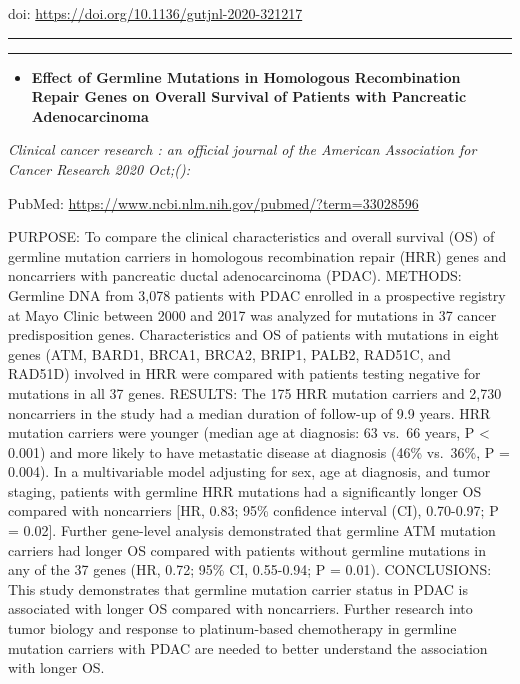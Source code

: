\documentclass[
]{article}
\providecommand{\tightlist}{%
  \setlength{\itemsep}{0pt}\setlength{\parskip}{0pt}}
\begin{document}
doi: \url{https://doi.org/10.1136/gutjnl-2020-321217}

\begin{center}\rule{0.5\linewidth}{0.5pt}\end{center}

\begin{center}\rule{0.5\linewidth}{0.5pt}\end{center}

\begin{itemize}
\tightlist
\item
  \textbf{Effect of Germline Mutations in Homologous Recombination
  Repair Genes on Overall Survival of Patients with Pancreatic
  Adenocarcinoma}
\end{itemize}

\emph{Clinical cancer research : an official journal of the American
Association for Cancer Research 2020 Oct;():}

PubMed: \url{https://www.ncbi.nlm.nih.gov/pubmed/?term=33028596}

PURPOSE: To compare the clinical characteristics and overall survival
(OS) of germline mutation carriers in homologous recombination repair
(HRR) genes and noncarriers with pancreatic ductal adenocarcinoma
(PDAC). METHODS: Germline DNA from 3,078 patients with PDAC enrolled in
a prospective registry at Mayo Clinic between 2000 and 2017 was analyzed
for mutations in 37 cancer predisposition genes. Characteristics and OS
of patients with mutations in eight genes (ATM, BARD1, BRCA1, BRCA2,
BRIP1, PALB2, RAD51C, and RAD51D) involved in HRR were compared with
patients testing negative for mutations in all 37 genes. RESULTS: The
175 HRR mutation carriers and 2,730 noncarriers in the study had a
median duration of follow-up of 9.9 years. HRR mutation carriers were
younger (median age at diagnosis: 63 vs.~66 years, P \textless{} 0.001)
and more likely to have metastatic disease at diagnosis (46\% vs.~36\%,
P = 0.004). In a multivariable model adjusting for sex, age at
diagnosis, and tumor staging, patients with germline HRR mutations had a
significantly longer OS compared with noncarriers {[}HR, 0.83; 95\%
confidence interval (CI), 0.70-0.97; P = 0.02{]}. Further gene-level
analysis demonstrated that germline ATM mutation carriers had longer OS
compared with patients without germline mutations in any of the 37 genes
(HR, 0.72; 95\% CI, 0.55-0.94; P = 0.01). CONCLUSIONS: This study
demonstrates that germline mutation carrier status in PDAC is associated
with longer OS compared with noncarriers. Further research into tumor
biology and response to platinum-based chemotherapy in germline mutation
carriers with PDAC are needed to better understand the association with
longer OS.
\end{document}
